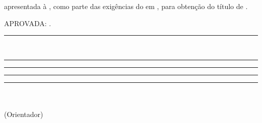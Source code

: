 \newpage
 \thispagestyle{empty}
 \setcounter{page}{1}
\begin{spacing}{1}
\begin{center}
{\MakeUppercase{\nome} \\ }

\vspace*{4.2cm}
{\MakeUppercase{\textbf{\titulo}} \\ }
\end{center}

\vspace*{2.6cm}
\singlespacing
\begin{flushright}
\begin{minipage}{7.5cm}
{\tipo apresentada à \instituicao, como parte
  das exigências do \curso em \programa, para
  obtenção do título de \textit{\titulop}.}
\end{minipage}
\end{flushright}
\vspace*{1.3cm}
%
%
APROVADA: \aprovacao.
\vfill
%
%
\begin{minipage}{0.45\linewidth}
\centering
\vspace{0.5cm}
\rule{\linewidth}{0.1mm}\\
{\membroa}%
\end{minipage}
\hfill
\begin{minipage}{0.45\linewidth}
\centering
\vspace*{0.5cm}
\rule{\linewidth}{0.1mm}
{\membrob}%
\end{minipage}
\vfill
\begin{minipage}{0.45\linewidth}
\centering
\rule{\linewidth}{0.1mm}
{\membroc}%
\end{minipage}
\hfill
\begin{minipage}{0.45\linewidth}
\centering
\rule{\linewidth}{0.1mm}
{\membrod}%
\end{minipage}

\vfill
\begin{center}
\begin{minipage}{7.5cm}
{\begin{center}
\rule{\linewidth}{0.1mm} \\
{\membroe}\\%
(Orientador)
\end{center}}
\end{minipage}
\end{center}
\end{spacing}
